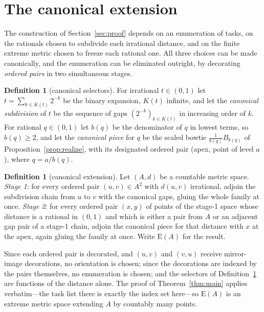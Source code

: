 \documentclass[11pt]{article}
\theoremstyle{definition}
\newtheorem{definition}[theorem]{Definition}
\theoremstyle{remark}
\newcommand{\E}{\mathrm{E}}
\begin{document}
\section{The canonical extension}
\label{sec:canonical}

The construction of Section~\ref{sec:proof} depends on an enumeration of tasks, on the
rationals chosen to subdivide each irrational distance, and on the finite extreme metric
chosen to freeze each rational one. All three choices can be made canonically, and the
enumeration can be eliminated outright, by decorating \emph{ordered pairs} in two
simultaneous stages.

\begin{definition}[canonical selectors]\label{def:selectors}
For irrational $t\in(0,1)$ let $t=\sum_{k\in K(t)}2^{-k}$ be the binary expansion, $K(t)$
infinite, and let the \emph{canonical subdivision} of $t$ be the sequence of gaps
$(2^{-k})_{k\in K(t)}$ in increasing order of $k$. For rational $q\in(0,1)$ let $b(q)$ be
the denominator of $q$ in lowest terms, so $b(q)\geq2$, and let the \emph{canonical piece}
for $q$ be the scaled bowtie $\tfrac{1}{b(q)}B_{b(q)}$ of Proposition~\ref{prop:realize},
with its designated ordered pair (apex, point of level $a$), where $q=a/b(q)$.
\end{definition}

\begin{definition}[canonical extension]\label{def:canonical}
Let $(A,d)$ be a countable metric space. \emph{Stage 1}: for every ordered pair
$(u,v)\in A^2$ with $d(u,v)$ irrational, adjoin the subdivision chain from $u$ to $v$ with
the canonical gaps, gluing the whole family at once. \emph{Stage 2}: for every ordered pair
$(x,y)$ of points of the stage-1 space whose distance is a rational in $(0,1)$ and which
is either a pair from $A$ or an adjacent gap pair of a stage-1 chain, adjoin the canonical
piece for that distance with $x$ at the apex, again gluing the family at once. Write
$\E(A)$ for the result.
\end{definition}

Since each ordered pair is decorated, and $(u,v)$ and $(v,u)$ receive mirror-image
decorations, no orientation is chosen; since the decorations are indexed by the pairs
themselves, no enumeration is chosen; and the selectors of Definition~\ref{def:selectors}
are functions of the distance alone. The proof of Theorem~\ref{thm:main} applies
verbatim---the task list there is exactly the index set here---so $\E(A)$ is an extreme
metric space extending $A$ by countably many points.
\end{document}

